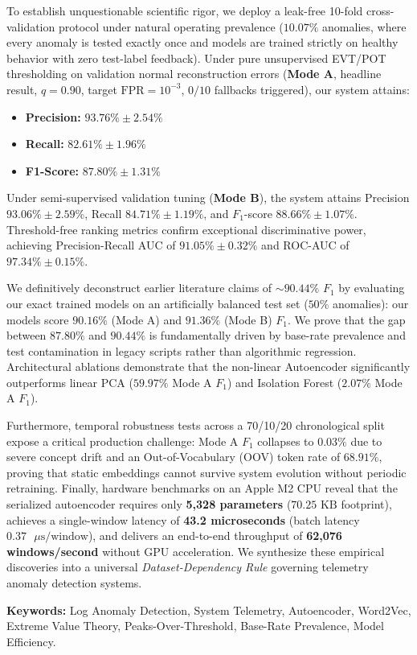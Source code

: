 To establish unquestionable scientific rigor, we deploy a leak-free 10-fold cross-validation protocol under natural operating prevalence ($10.07\%$ anomalies, where every anomaly is tested exactly once and models are trained strictly on healthy behavior with zero test-label feedback). Under pure unsupervised EVT/POT thresholding on validation normal reconstruction errors (\textbf{Mode A}, headline result, $q=0.90$, target $\text{FPR}=10^{-3}$, $0/10$ fallbacks triggered), our system attains:
\begin{itemize}
    \item \textbf{Precision:} $93.76\% \pm 2.54\%$
    \item \textbf{Recall:} $82.61\% \pm 1.96\%$
    \item \textbf{F1-Score:} $\mathbf{87.80\% \pm 1.31\%}$
\end{itemize}
Under semi-supervised validation tuning (\textbf{Mode B}), the system attains Precision $93.06\% \pm 2.59\%$, Recall $84.71\% \pm 1.19\%$, and $F_1$-score $\mathbf{88.66\% \pm 1.07\%}$. Threshold-free ranking metrics confirm exceptional discriminative power, achieving Precision-Recall AUC of $\mathbf{91.05\% \pm 0.32\%}$ and ROC-AUC of $\mathbf{97.34\% \pm 0.15\%}$.

We definitively deconstruct earlier literature claims of $\sim 90.44\%$ $F_1$ by evaluating our exact trained models on an artificially balanced test set ($50\%$ anomalies): our models score $\mathbf{90.16\%}$ (Mode A) and $\mathbf{91.36\%}$ (Mode B) $F_1$. We prove that the gap between $87.80\%$ and $90.44\%$ is fundamentally driven by base-rate prevalence and test contamination in legacy scripts rather than algorithmic regression. Architectural ablations demonstrate that the non-linear Autoencoder significantly outperforms linear PCA ($59.97\%$ Mode A $F_1$) and Isolation Forest ($2.07\%$ Mode A $F_1$).

Furthermore, temporal robustness tests across a 70/10/20 chronological split expose a critical production challenge: Mode A $F_1$ collapses to $0.03\%$ due to severe concept drift and an Out-of-Vocabulary (OOV) token rate of $68.91\%$, proving that static embeddings cannot survive system evolution without periodic retraining. Finally, hardware benchmarks on an Apple M2 CPU reveal that the serialized autoencoder requires only \textbf{5,328 parameters} ($70.25\text{ KB}$ footprint), achieves a single-window latency of \textbf{43.2 microseconds} (batch latency $0.37\text{ }\mu\text{s/window}$), and delivers an end-to-end throughput of \textbf{62,076 windows/second} without GPU acceleration. We synthesize these empirical discoveries into a universal \textit{Dataset-Dependency Rule} governing telemetry anomaly detection systems.

\vspace{0.8cm}
\noindent\textbf{Keywords:} Log Anomaly Detection, System Telemetry, Autoencoder, Word2Vec, Extreme Value Theory, Peaks-Over-Threshold, Base-Rate Prevalence, Model Efficiency.

